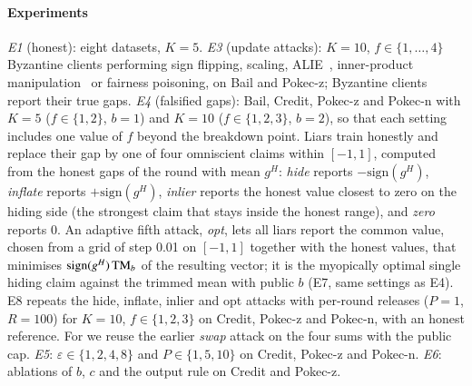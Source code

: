 \paragraph{Experiments}
\emph{E1} (honest): eight datasets, $K=5$. \emph{E3} (update attacks): $K=10$, $f\in\{1,\dots,4\}$ Byzantine clients performing sign flipping, scaling, ALIE~\citep{baruch2019little}, inner-product manipulation~\citep{xie2019fall} or fairness poisoning, on Bail and Pokec-z; Byzantine clients report their true gaps. \emph{E4} (falsified gaps): Bail, Credit, Pokec-z and Pokec-n with $K=5$ ($f\in\{1,2\}$, $b=1$) and $K=10$ ($f\in\{1,2,3\}$, $b=2$), so that each setting includes one value of $f$ beyond the breakdown point. Liars train honestly and replace their gap by one of four omniscient claims within $[-1,1]$, computed from the honest gaps of the round with mean $g^H$: \emph{hide} reports $-\mathrm{sign}(g^H)$, \emph{inflate} reports $+\mathrm{sign}(g^H)$, \emph{inlier} reports the honest value closest to zero on the hiding side (the strongest claim that stays inside the honest range), and \emph{zero} reports $0$. An adaptive fifth attack, \emph{opt}, lets all liars report the common value, chosen from a grid of step 0.01 on $[-1,1]$ together with the honest values, that minimises $\mathrm{sign}(g^H)\,\mathrm{TM}_b$ of the resulting vector; it is the myopically optimal single hiding claim against the trimmed mean with public $b$ (E7, same settings as E4). E8 repeats the hide, inflate, inlier and opt attacks with per-round releases ($P=1$, $R=100$) for $K=10$, $f\in\{1,2,3\}$ on Credit, Pokec-z and Pokec-n, with an honest reference. For \clamp{} we reuse the earlier \emph{swap} attack on the four sums with the public cap. \emph{E5}: $\varepsilon\in\{1,2,4,8\}$ and $P\in\{1,5,10\}$ on Credit, Pokec-z and Pokec-n. \emph{E6}: ablations of $b$, $c$ and the output rule on Credit and Pokec-z.
